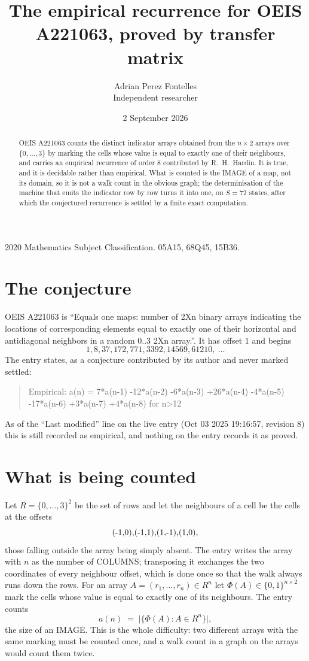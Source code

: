 \documentclass[11pt,a4paper]{article}
\title{The empirical recurrence for OEIS A221063, proved by transfer matrix}
\author{Adrian Perez Fontelles\\ \small Independent researcher}
\date{2 September 2026}
\theoremstyle{plain}
\theoremstyle{definition}
\begin{document}
\maketitle

\begin{abstract}
OEIS A221063 counts the distinct indicator arrays obtained from the $n\times2$ arrays over
$\{0,\dots,3\}$ by marking the cells whose value is equal to exactly one of their neighbours, and carries an
empirical recurrence of order $8$ contributed by R.~H.~Hardin. It is true, and it is
decidable rather than empirical. What is counted is the IMAGE of a map, not its domain, so it
is not a walk count in the obvious graph; the determinisation of the machine that emits the
indicator row by row turns it into one, on $S=72$ states, after which the conjectured
recurrence is settled by a finite exact computation.
\end{abstract}

\noindent\small 2020 Mathematics Subject Classification. 05A15, 68Q45, 15B36.\normalsize

\section{The conjecture}

OEIS A221063 is ``Equals one maps: number of 2Xn binary arrays indicating the locations of corresponding elements equal to exactly one of their horizontal and antidiagonal neighbors in a random 0..3 2Xn array.''. It has offset $1$ and begins
\[
1, 8, 37, 172, 771, 3392, 14569, 61210,\ \dots
\]
The entry states, as a conjecture contributed by its author and never marked settled:
\begin{quote}
Empirical: a(n) = 7*a(n-1) -12*a(n-2) -6*a(n-3) +26*a(n-4) -4*a(n-5) -17*a(n-6) +3*a(n-7) +4*a(n-8) for n>12
\end{quote}
As of the ``Last modified'' line on the live entry (Oct 03 2025 19:16:57, revision 8) this is still
recorded as empirical, and nothing on the entry records it as proved.

\section{What is being counted}

Let $R=\{0,\dots,3\}^{2}$ be the set of rows and let the neighbours of a cell be the
cells at the offsets
\[
$(-1,0)$, $(-1,1)$, $(1,-1)$, $(1,0)$,
\]
those falling outside the array being simply absent. The entry writes the array with $n$ as the number of COLUMNS; transposing it exchanges the two coordinates of every neighbour offset, which is done once so that the walk always runs down the rows. For an array
$A=(r_1,\dots,r_n)\in R^n$ let $\Phi(A)\in\{0,1\}^{n\times2}$ mark the cells whose value
is equal to exactly one of its neighbours. The entry counts
\[
a(n)\;=\;\bigl|\{\Phi(A):A\in R^n\}\bigr| ,
\]
the size of an IMAGE. This is the whole difficulty: two different arrays with the same marking
must be counted once, and a walk count in a graph on the arrays would count them twice.
\end{document}
